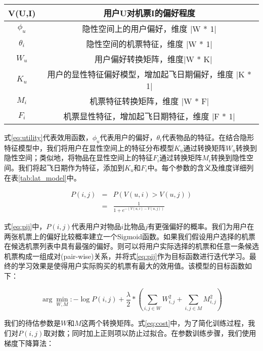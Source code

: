 \begin{table}[!hpb]
  \centering
  \begin{tabular}{|c|c|} \hline 
V(U,I) & 用户U对机票I的偏好程度 \\ \hline
$\phi_u$ & 隐性空间上的用户偏好，维度 |W * 1| \\ \hline
$\theta_i$ & 隐性空间的机票特征，维度 |W * 1| \\ \hline
$W_u$ &　用户偏好转换矩阵，维度|W * K| \\ \hline
$K_u$ & 用户的显性特征偏好模型，增加起飞日期偏好，维度 |K * 1| \\ \hline
$M_i$ & 机票特征转换矩阵，维度 |W * F| \\ \hline
$F_i$ & 机票显性特征，增加起飞日期特征，维度 |F * 1| \\ \hline
  \end{tabular}
\end{table}

式\ref{eq:utility}代表效用函数，$\phi_u$代表用户的偏好，$\theta_i$代表物品的特征。在结合隐形特征模型中，我们将用户在显性空间上的特征分布模型$K_u$通过转换矩阵$W_u$转换到隐性空间；类似地，将物品在显性空间上的特征$F_i$通过转换矩阵$M_i$转换到隐性空间。我们将起飞日期作为特征，添加到$K_u$和$F_i$中。每个参数的含义及维度详细列在表\ref{tab:lat_model}中。

\begin{eqnarray}
\label{eq:pij}
    P(i,j) & = & P(V(u,i) > V(u,j)) \nonumber \\
	 & = &\frac{1}{1+e^{-(V(u,i) - V(u,j))}}
\end{eqnarray}

式\ref{eq:pij}中，$P(i,j)$代表用户对物品$i$比物品$j$有更强偏好的概率。我们为用户在两张机票上的偏好比较概率建立一个Sigmoid函数\cite{jingfan1997novel}。如果我们假设用户选择的机票在候选机票列表中具有最强的偏好。则可以将用户实际选择的机票和任意一条候选机票构成一组成对(pair-wise)关系，并将式\ref{eq:pij}作为目标函数进行迭代学习。最终的学习效果是使得用户实际购买的机票有最大的效用值。该模型的目标函数如下：

\begin{equation}
\label{eq:cost}
  \arg\min_{W,M} : - \log P(i,j) + \frac{\lambda}{2} * (\sum_{i,j \in W}W_{i,j}^2 + \sum_{i,j \in M}M_{i,j}^2)
\end{equation}

我们的待估参数是$W$和$M$这两个转换矩阵。式\ref{eq:cost}中，为了简化训练过程，我们对$P(i,j)$取对数；同时加上正则项以防止过拟合。在参数训练步骤，我们使用梯度下降算法：

